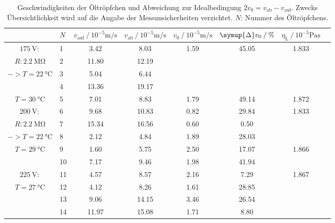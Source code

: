 \begin{table}[H]
    \centering
    \caption{Geschwindigkeiten der Öltröpfchen und Abweichung zur Idealbedingung $2v_0 = v_\text{ab}- v_\text{auf}$. Zwecks Übersichtlichkeit wird auf die Angabe der 
    Messunsicherheiten verzichtet. $N$: Nummer des Öltröpfchens.}
    \label{tab:Geschwindigkeiten}
    \begin{tabular}{c l S[table-format = 2.2] S S S[table-format = 1.2] S[table-format = 2.2] S[table-format = 1.3]}
      \toprule
        {} & {$N$} & {$v_\text{auf} \mathbin{/} 10^{-5} \unit{\metre\per\second}$} & {$v_\text{ab} \mathbin{/} 10^{-5} \unit{\metre\per\second}$} &%
        {$v_0 \mathbin{/} 10^{-5} \unit{\metre\per\second}$} & {$\symup{\Delta} v_0 \mathbin{/} \unit{\percent}$} &%
        {$\eta_\text{L} \mathbin{/} 10^{-5} \unit{\pascal\second}$}\\
        \midrule
        {$\qty{175}{\volt}:$}          &  {1} & 3.42  &  8.03 & 1.59 & 45.05 & 1.833 \\
        {$R: \qty{2.2}{\mega\ohm}$}    &  {2} & 11.80 & 12.19 &      &       & \\
        {$-> T = \qty{22}{\celsius}$} &   {3} &  5.04 &  6.44 &      &       & \\
        {                   } &           {4} & 13.36 & 19.17 &      &       & \\
        {$T = \qty{30}{\celsius}$}     &  {5} &  7.01 &  8.83 & 1.79 & 49.14 & 1.872 \\
        {$\qty{200}{\volt}:$} &           {6} &  9.68 & 10.83 & 0.82 & 29.84 & 1.833 \\
         {$R: \qty{2.2}{\mega\ohm}$}   &  {7} & 15.34 & 16.56 & 0.60 &  0.50 & \\
         {$-> T = \qty{22}{\celsius}$}&   {8} &  2.12 &  4.84 & 1.89 & 28.03 & \\
        {$T = \qty{29}{\celsius}$}     &  {9} &  1.60 &  5.75 & 2.50 & 17.07 & 1.866 \\
        {                   } &          {10} &  7.17 &  9.46 & 1.98 & 41.94 & \\ 
        {$\qty{225}{\volt}:$} &          {11} &  4.57 &  8.57 & 2.16 &  7.29 & 1.867 \\ 
        $T = \qty{27}{\celsius}$ &       {12} &  4.12 &  8.26 & 1.61 & 28.85 & \\
        {                   } &          {13} &  9.06 & 14.15 & 3.46 & 26.54 & \\
        {                   } &          {14} & 11.97 & 15.08 & 1.71 &  8.80 & \\

\end{tabular}
\end{table}

